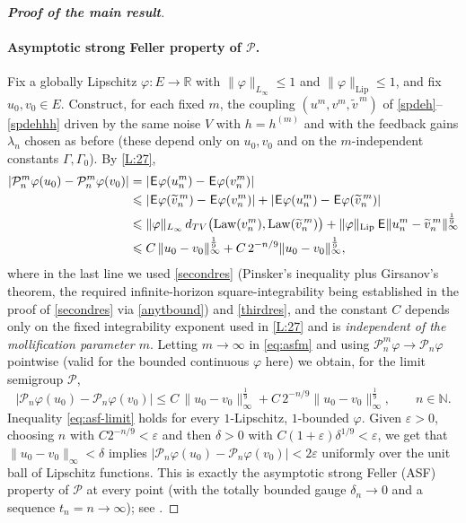 \documentclass[12pt]{article}
\theoremstyle{definition}
\DeclareMathOperator{\1}{\mathbbm{1}}%
\DeclareMathOperator{\law}{Law}%
\def\E{\hskip.15ex\mathsf{E}\hskip.10ex}
\def\phi{\varphi}
\renewcommand{\le}{\leqslant}
\newcommand{\nn}{\nonumber}
\newcommand{\wt}{\widetilde}
\newcommand{\N}{\mathbb{N}}
\newcommand{\PP}{\mathcal{P}}
\newcommand{\R}{\mathbb{R}}
\begin{document}
\begin{proof}[\textbf{Proof of the main result}]
\paragraph{Asymptotic strong Feller property of $\PP$.}
Fix a globally Lipschitz $\phi\colon E\to\R$ with $\|\phi\|_{L_\infty}\le1$ and
$\|\phi\|_{\mathrm{Lip}}\le1$, and fix $u_0,v_0\in E$. Construct, for each fixed $m$, the
coupling $(u^m,v^m,\wt v^{\,m})$ of \eqref{spdeh}--\eqref{spdehhh} driven by the same noise $V$
with $h=h^{(m)}$ and with the feedback gains $\lambda_n$ chosen as before (these depend only on
$u_0,v_0$ and on the $m$-independent constants $\Gamma,\Gamma_0$). By \cref{L:27},
\begin{align}\label{eq:asfm}
|\PP^m_n\phi(u_0)-\PP^m_n\phi(v_0)|
&=|\E\phi(u^m_n)-\E\phi(v^m_n)|\nn\\
&\le |\E\phi(\wt v^{\,m}_n)-\E\phi(v^m_n)|+|\E\phi(u^m_n)-\E\phi(\wt v^{\,m}_n)|\nn\\
&\le \|\phi\|_{L_\infty}\,d_{TV}\bigl(\law(v^m_n),\law(\wt v^{\,m}_n)\bigr)
   +\|\phi\|_{\mathrm{Lip}}\,\E\|u^m_n-\wt v^{\,m}_n\|^{\frac19}_{\infty}\nn\\
&\le C\,\|u_0-v_0\|_\infty^{\frac19}+C\,2^{-n/9}\|u_0-v_0\|_\infty^{\frac19},
\end{align}
where in the last line we used \eqref{secondres} (Pinsker's inequality plus Girsanov's
theorem, the required infinite-horizon square-integrability being established in the proof of
\eqref{secondres} via \eqref{anytbound}) and \eqref{thirdres}, and the constant $C$ depends only on the fixed integrability exponent used in \cref{L:27} and is \emph{independent of the mollification parameter $m$}. Letting $m\to\infty$
in \eqref{eq:asfm} and using $\PP^m_n\phi\to\PP_n\phi$ pointwise (valid for the bounded
continuous $\phi$ here) we obtain, for the limit semigroup $\PP$,
\begin{equation}\label{eq:asf-limit}
|\PP_n\phi(u_0)-\PP_n\phi(v_0)|\le C\,\|u_0-v_0\|_\infty^{\frac19}+C\,2^{-n/9}\|u_0-v_0\|_\infty^{\frac19},
\qquad n\in\N .
\end{equation}
Inequality \eqref{eq:asf-limit} holds for every $1$-Lipschitz, $1$-bounded $\phi$. Given
$\varepsilon>0$, choosing $n$ with $C2^{-n/9}<\varepsilon$ and then $\delta>0$ with
$C(1+\varepsilon)\delta^{1/9}<\varepsilon$, we get that $\|u_0-v_0\|_\infty<\delta$ implies
$|\PP_n\phi(u_0)-\PP_n\phi(v_0)|<2\varepsilon$ uniformly over the unit ball of Lipschitz
functions. This is exactly the asymptotic strong Feller (ASF) property of $\PP$ at every
point (with the totally bounded gauge $\delta_n\to0$ and a sequence $t_n=n\to\infty$); see
\cite[Definition~3.8 and Proposition~3.12]{HM06}.


\end{proof}
\end{document}
